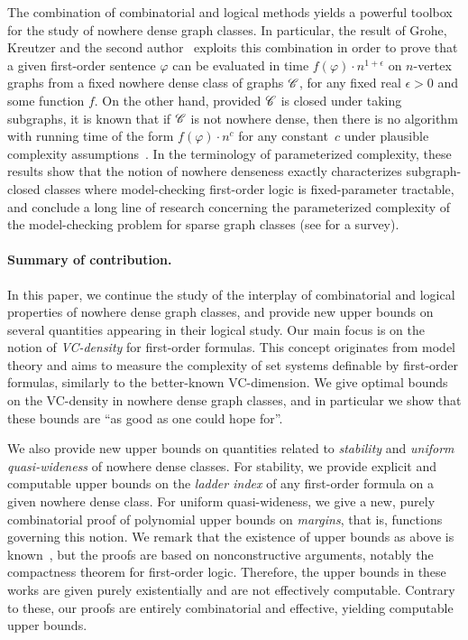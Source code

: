 The combination of combinatorial and logical methods yields a powerful
toolbox for the study of nowhere dense graph classes. In particular,
the result of Grohe, Kreutzer and the second
author~\cite{grohe2014deciding} exploits this combination in order to
prove that a given first-order sentence $\varphi$ can be evaluated in
time $f(\varphi)\cdot n^{1+\epsilon}$ on $n$-vertex graphs from a
fixed nowhere dense class of graphs $\mathscr{C}$, for any fixed real
$\epsilon>0$ and some function $f$.  On the other hand, provided
$\mathscr{C}$ is closed under taking subgraphs, it is known that if $\mathscr{C}$ is
not nowhere dense, then there is no algorithm with running time of the
form $f(\varphi)\cdot n^c$ for any constant~$c$ under plausible
complexity assumptions~\cite{dvovrak2013testing}.  In the terminology
of parameterized complexity, these results show that the notion of
nowhere denseness exactly characterizes subgraph-closed classes where
model-checking first-order logic is fixed-parameter tractable, and
conclude a long line of research concerning the parameterized
complexity of the model-checking problem for sparse graph classes (see
\cite{grokre11} for a survey).

\paragraph{Summary of contribution.} In this paper, we continue the
study of the interplay of combinatorial and logical properties of
nowhere dense graph classes, and provide new upper bounds on several
quantities appearing in their logical study.  Our main focus is on the
notion of \emph{VC-density} for first-order formulas. This concept
originates from model theory and aims to measure the complexity of set
systems definable by first-order formulas, similarly to the
better-known VC-dimension.  We give optimal bounds on the VC-density
in nowhere dense graph classes, and in particular we show that these
bounds are ``as good as one could hope for''.

We also provide new upper bounds on quantities related to
{\em{stability}} and {\em{uniform quasi-wideness}} of nowhere dense
classes.  For stability, we provide explicit and computable upper
bounds on the \emph{ladder index} of any first-order formula on a
given nowhere dense class.  For uniform quasi-wideness, we give a new,
purely combinatorial proof of polynomial upper bounds on
{\em{margins}}, that is, functions governing this notion.  We remark
that the existence of upper bounds as above is
known~\cite{adler2014interpreting,siebertz2016polynomial}, but the
proofs are based on nonconstructive arguments, notably the compactness
theorem for first-order logic. Therefore, the upper bounds in these
works are given purely existentially and are not effectively
computable.  Contrary to these, our proofs are entirely combinatorial
and effective, yielding computable upper bounds.

